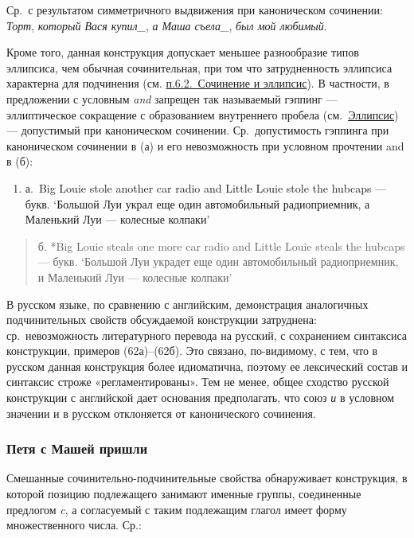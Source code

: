 Ср.~с результатом симметричного выдвижения при каноническом сочинении:
\textit{Торт}, \textit{который Вася купил\_}, \textit{а Маша съела\_},
\textit{был мой любимый}.

Кроме того, данная конструкция допускает меньшее разнообразие типов
эллипсиса, чем обычная сочинительная, при том что затрудненность
эллипсиса характерна для подчинения (см. \underline{п.6.2.~Сочинение и
  эллипсис}). В частности, в предложении с условным \textit{and} запрещен
так называемый гэппинг --- эллиптическое сокращение с образованием
внутреннего пробела (см.~\underline{Эллипсис}) --- допустимый при
каноническом сочинении. Ср.~допустимость гэппинга при каноническом
сочинении в (а) и его невозможность при условном прочтении and в (б):

\begin{enumerate}
  \def\labelenumi{(\arabic{enumi})}
  \setcounter{enumi}{61}
  \item
        а.~Big Louie stole another car radio and Little Louie stole the
        hubcaps --- букв. `Большой Луи украл еще один автомобильный
        радиоприемник, а Маленький Луи --- колесные колпаки'
\end{enumerate}

\begin{quote}
  б. *Big Louie steals one more car radio and Little Louie steals the
  hubcaps --- букв. `Большой Луи украдет еще один автомобильный
  радиоприемник, и Маленький Луи --- колесные колпаки'
\end{quote}

В русском языке, по сравнению с английским, демонстрация аналогичных
подчинительных свойств обсуждаемой конструкции затруднена:
ср.~невозможность литературного перевода на русский, с сохранением
синтаксиса конструкции, примеров (62а)--(62б). Это связано, по-видимому,
с тем, что в русском данная конструкция более идиоматична, поэтому ее
лексический состав и синтаксис строже «регламентированы». Тем не менее,
общее сходство русской конструкции с английской дает основания
предполагать, что союз \textit{и} в условном значении и в русском
отклоняется от канонического сочинения.

\subsubsection{Петя с Машей
  пришли}\label{ux43fux435ux442ux44f-ux441-ux43cux430ux448ux435ux439-ux43fux440ux438ux448ux43bux438}

Смешанные сочинительно-подчинительные свойства обнаруживает конструкция,
в которой позицию подлежащего занимают именные группы, соединенные
предлогом \textit{c}, а согласуемый с таким подлежащим глагол имеет форму
множественного числа. Ср.:

